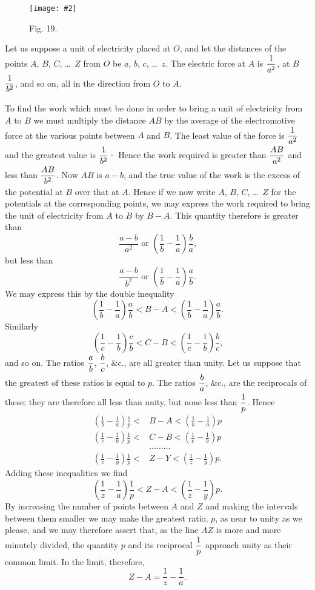 \documentclass[12pt,oneside]{book}[2021/10/04]
\newcommand{\Runhead}[1]{\fancyhead[C]{\iffloatpage{}{\small#1}}}
\newcommand{\xp}{\rule[-2.0ex]{0pt}{5.2ex}}
\newcommand{\widefig}[3]{
\begin{figure}[ht!]
\centering
\texttt{[image: \#2]}
\caption*{\small #3}
\end{figure}}
\newcommand{\¬}{\hphantom{0}}
\begin{document}
\widefig{0.7}{081.png}{Fig. 19.}
Let us suppose a unit of electricity placed at \(O\), and let the
distances of the points \(A\), \(B\), \(C\), \ldots\ \(Z\) from \(O\) be \(a\), \(b\), \(c\), \ldots\ \(z\). The
electric force at \(A\) is \(\xp\dfrac{1}{a^2}\), at \(B\) \(\xp\dfrac{1}{b^2}\), and so on, all in the direction
from \(O\) to \(A\).
\Runhead{POTENTIAL AT A POINT.}

To find the work which must be done in order to bring a
unit of electricity from \(A\) to \(B\) we must multiply the distance \(AB\)
by the average of the electromotive force at the various points
between \(A\) and \(B\). The least value of the force is \(\xp\dfrac{1}{a^2}\) and the
greatest value is \(\xp\dfrac{1}{b^2}\)· Hence the work required is greater than \(\xp\dfrac{AB}{a^2}\)
and less than \(\xp\dfrac{AB}{b^2}\). Now \(AB\) is \(a - b\), and the true value of the
work is the excess of the potential at \(B\) over that at \(A\). Hence
if we now write \(A\), \(B\), \(C\), \ldots\ \(Z\) for the potentials at the corresponding
points, we may express the work required to bring the unit
of electricity from \(A\) to \(B\) by \(B - A\). This quantity therefore is
greater than
\[
\frac{a - b}{a^2} \text{ or } \left(\frac{1}{b} - \frac{1}{a}\right) \frac{b}{a}\text{,}
\]
but less than
\[
\frac{a - b}{b^2} \text{ or } \left(\frac{1}{b} - \frac{1}{a}\right) \frac{a}{b}\text{.}
\]
We may express this by the double inequality
\[
\left(\frac{1}{b} - \frac{1}{a}\right)\frac{a}{b} < B - A < \left(\frac{1}{b} - \frac{1}{a}\right) \frac{a}{b}\text{.}
\]
Similarly
\[
\left(\frac{1}{c} - \frac{1}{b}\right) \frac{c}{b} < C - B < \left(\frac{1}{c} - \frac{1}{b}\right) \frac{b}{c}\text{,}
\]
and so on. The ratios \(\xp\dfrac{a}{b}\), \(\xp\dfrac{b}{c}\), \&c., are all greater than unity. Let
us suppose that the greatest of these ratios is equal to \(p\). The
ratios \(\xp\dfrac{b}{a}\), \&c., are the reciprocals of these; they are therefore all
less than unity, but none less than \(\xp\dfrac{1}{p}\). Hence
\begin{align*}
\left(\frac{1}{b} - \frac{1}{a}\right) \frac{1}{p} < &B - A < \left(\frac{1}{b} - \frac{1}{a}\right) p\\
\left(\frac{1}{c} - \frac{1}{b}\right) \frac{1}{p} < &C - B < \left(\frac{1}{c} - \frac{1}{b}\right) p\\
&\ldots \ldots \ldots\\
\left(\frac{1}{z} - \frac{1}{y}\right) \frac{1}{p} < &Z - Y < \left(\frac{1}{z} - \frac{1}{y}\right) p\text{.}
\end{align*}
Adding these inequalities we find
\[
\left(\frac{1}{z} - \frac{1}{a}\right) \frac{1}{p} < Z - A < \left(\frac{1}{z} - \frac{1}{y}\right) p\text{.}
\]
By increasing the number of points between \(A\) and \(Z\) and making
the intervals between them smaller we may make the greatest
ratio, \(p\), as near to unity as we please, and we may therefore
assert that, as the line \(AZ\) is more and more minutely divided,
the quantity \(p\) and its reciprocal \(\xp\dfrac{1}{p}\) approach unity as their common
limit. In the limit, therefore,
\[
Z - A = \frac{1}{z} - \frac{1}{a}\text{.}
\]
\end{document}
